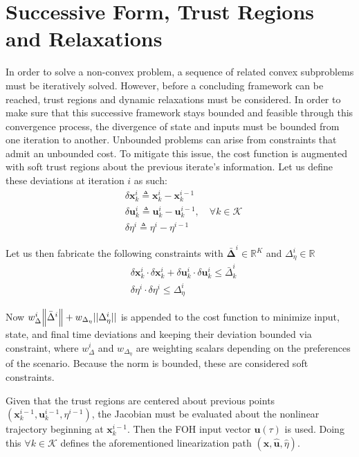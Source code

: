 \documentclass[conf]{new-aiaa}
\begin{document}
\section{Successive Form, Trust Regions and Relaxations}

In order to solve a non-convex problem, a sequence of related convex subproblems must be iteratively solved. However, before a concluding framework can be reached, trust regions and dynamic relaxations must be considered. In order to make sure that this successive framework stays bounded and feasible through this convergence process, the divergence of state and inputs must be bounded from one iteration to another. Unbounded problems can arise from constraints that admit an unbounded cost. To mitigate this issue, the cost function is augmented with soft trust regions about the previous iterate's information. Let us define these deviations at iteration $i$ as such:
\begin{align}
& \delta \mathbf{x}_k^i \triangleq \mathbf{x}_k^i - \mathbf{x}_k^{i-1} \\
& \delta \mathbf{u}_k^i \triangleq \mathbf{u}_k^i - \mathbf{u}_k^{i-1}, \quad \forall k \in \mathcal{K}\\
& \delta \eta^i \triangleq \eta^i - \eta^{i-1}
\end{align}

Let us then fabricate the following constraints with $\bm{\bar{\Delta}}^i \in \mathbb{R}^K$ and $\Delta_\eta^i \in \mathbb{R}$
\begin{align}
& \delta \mathbf{x}_k^i \cdot \delta \mathbf{x}_k^i + \delta \mathbf{u}_k^i \cdot \delta \mathbf{u}_k^i \leq \bar{\Delta}_k^i \\
& \delta \eta^i \cdot \delta \eta^i \leq \Delta_\eta^i
\end{align}

Now $w_\Delta^i \norm{{\bar{\Delta}}^i} + w_{\Delta_\eta} ||\Delta_\eta^i ||$ is appended to the cost function to minimize input, state, and final time deviations and keeping their deviation bounded via constraint, where $w_\Delta^i$ and $w_{\Delta_\eta}$ are weighting scalars depending on the preferences of the scenario. Because the norm is bounded, these are considered soft constraints.

Given that the trust regions are centered about previous points $(\mathbf{x}_{k}^{i-1},\mathbf{u}_{k}^{i-1},\eta^{i-1})$, the Jacobian must be evaluated about the nonlinear trajectory beginning at $\mathbf{x}_{k}^{i-1}$. Then the FOH input vector $\mathbf{u}(\tau)$ is used. Doing this $\forall k \in \mathcal{K}$ defines the aforementioned linearization path $(\hat{\mathbf{x}}, \hat{\mathbf{u}}, \hat{\eta})$. 
\end{document}
